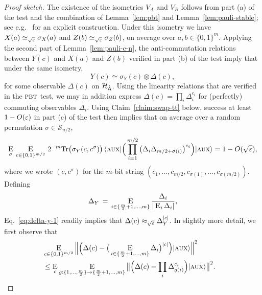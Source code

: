 \begin{proof}[Proof sketch]
The existence of the isometries $V_A$ and $V_B$ follows from part (a) of the test and the combination of Lemma~\ref{lem:pbt} and Lemma~\ref{lem:pauli-stable}; see e.g.~\cite{natarajan2016robust} for an explicit construction. 
 Under this isometry we have $X(a) \simeq_{\sqrt{\varepsilon}} \sigma_X(a)$ and $Z(b)\simeq_{\sqrt{\varepsilon}} \sigma_Z(b)$, on average over $a,b\in\{0,1\}^m$. Applying the second part of Lemma~\ref{lem:pauli-c-n},  the  anti-commutation relations between $Y(c)$ and $X(a)$ and $Z(b)$ verified in part (b) of the test imply that under the same isometry,
$$ Y(c) \simeq \sigma_Y(c) \otimes {\Delta}(c),$$
for some observable ${\Delta}(c)$ on ${\mathcal{H}}_{\hat{{\textsf{A}}}}$. Using the linearity relations that are verified in the $\textsc{pbt}$ test, we may in addition express $\Delta(c) = \prod_i \Delta_{i}^{c_i}$ for (perfectly) commuting observables $\Delta_i$. Using Claim~\ref{claim:swap-tt} below, success at least $1-O(\varepsilon)$ in part (c) of the test then implies that on average over a random permutation $\sigma \in \mathcal{S}_{n/2}$, 
\begin{equation}\label{eq:delta-y-1}
 \mathop{\textsc{E}}_{\sigma} \,\mathop{\textsc{E}}_{c\in\{0,1\}^{m/2}}\,2^{-m}\mbox{\rm Tr} \big(\sigma_Y(c,c^\sigma)\big)\,\langle\textsc {aux}| \Big( \prod_{i=1}^{m/2}\big( \Delta_i \Delta_{m/2+ \sigma(i)} \big)^{c_i} \Big) |\textsc {aux}\rangle  = 1- O(\sqrt{\varepsilon}),
\end{equation}
where we wrote $(c,c^\sigma)$ for the $m$-bit string $(c_1,\ldots,c_{m/2},c_{\sigma(1)},\ldots,c_{\sigma(m/2)})$. Defining
 \begin{equation}\label{eq:delta-y-3}
\Delta_Y \,=\, \mathop{\textsc{E}}_{i\in\{\frac{m}{2}+1,\ldots,m\}} \frac{\Delta_i}{|\mathop{\textsc{E}}_{i} \Delta_i|},
\end{equation}
Eq.~\eqref{eq:delta-y-1} readily implies that $\Delta(c) \approx_{\sqrt{\varepsilon}} \Delta_Y^{|c|}$. In slightly more detail, we first observe that
\begin{align}
&
\Es{c\in\{0,1\}^{m/2}} \Big\| \Big(\Delta(c) - \big(\Es{i\in\{\frac{m}{2}+1,\ldots,m\}} \Delta_{i}\big)^{|c|}\Big) \ket{\aux} \Big\|^2& \\
&\leq 
\Es{c} \Es{g:\{1,\ldots,\frac{m}{2}\}\to\{\frac{m}{2}+1,\ldots,m\}} \big\|\Big( \Delta(c) - \prod_i \Delta_{g(i)}^{c_i}\Big) \ket{\aux} \big\|^2.\label{eq:delta-y-2}

\end{align}
\end{proof}
